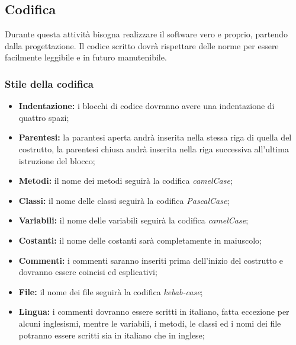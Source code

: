 \subsection{Codifica}
Durante questa attività bisogna realizzare il software vero e proprio, partendo dalla progettazione.
Il codice scritto dovrà rispettare delle norme per essere facilmente leggibile e in futuro manutenibile.

\subsubsection{Stile della codifica}

\begin{itemize}
    \item \textbf{Indentazione:} i blocchi di codice dovranno avere una indentazione di quattro spazi;
    \item \textbf{Parentesi:} la parantesi aperta andrà inserita nella stessa riga di quella del costrutto, la parentesi chiusa andrà inserita nella riga successiva all'ultima istruzione del blocco;
    \item \textbf{Metodi:} il nome dei metodi seguirà la codifica \textit{camelCase};
    \item \textbf{Classi:} il nome delle classi seguirà la codifica \textit{PascalCase};
    \item \textbf{Variabili:} il nome delle variabili seguirà la codifica \textit{camelCase};
    \item \textbf{Costanti:} il nome delle costanti sarà completamente in maiuscolo;
    \item \textbf{Commenti:} i commenti saranno inseriti prima dell'inizio del costrutto e dovranno essere coincisi ed esplicativi;
    \item \textbf{File:} il nome dei file seguirà la codifica \textit{kebab-case};
    \item \textbf{Lingua:} i commenti dovranno essere scritti in italiano, fatta eccezione per alcuni inglesismi, mentre le variabili, i metodi, le classi ed i nomi dei file potranno essere scritti sia in italiano che in inglese;
\end{itemize}